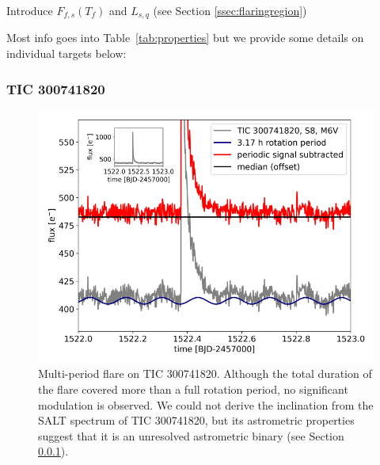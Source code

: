 \documentclass[fleqn,usenatbib,letters]{mnras}%
\newcommand{\FF}{TIC 300741820} %
\begin{document}
Introduce $F_{f,s}(T_f)$ and $L_{s,q}$ (see Section \ref{ssec:flaringregion})

Most info goes into Table~\ref{tab:properties} but we provide some details on individual targets below:

\subsubsection{\FF}
\label{sec:propsF}
\begin{figure}
	\includegraphics[width=\columnwidth]{figures/EPIC300741820_inset.png}
    \caption{Multi-period flare on \FF. Although the total duration of the flare covered more than a full rotation period, no significant modulation is observed. We could not derive the inclination from the SALT spectrum of \FF, but its astrometric properties suggest that it is an unresolved astrometric binary (see Section \ref{sec:propsF}).}
    \label{fig:\FF}
\end{figure}
\end{document}
